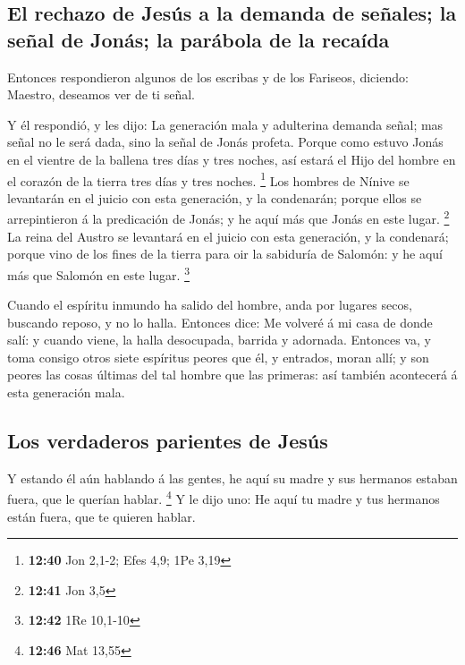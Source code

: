 \hypertarget{el-rechazo-de-jesuxfas-a-la-demanda-de-seuxf1ales-la-seuxf1al-de-jonuxe1s-la-paruxe1bola-de-la-recauxedda}{%
\subsection{El rechazo de Jesús a la demanda de señales; la señal de
Jonás; la parábola de la
recaída}\label{el-rechazo-de-jesuxfas-a-la-demanda-de-seuxf1ales-la-seuxf1al-de-jonuxe1s-la-paruxe1bola-de-la-recauxedda}}

 Entonces respondieron algunos de los escribas y de los
Fariseos, diciendo: Maestro, deseamos ver de ti señal.

 Y él respondió, y les dijo: La generación mala y
adulterina demanda señal; mas señal no le será dada, sino la señal de
Jonás profeta.  Porque como estuvo Jonás en el vientre de
la ballena tres días y tres noches, así estará el Hijo del hombre en el
corazón de la tierra tres días y tres noches. \footnote{\textbf{12:40}
  Jon 2,1-2; Efes 4,9; 1Pe 3,19}  Los hombres de Nínive
se levantarán en el juicio con esta generación, y la condenarán; porque
ellos se arrepintieron á la predicación de Jonás; y he aquí más que
Jonás en este lugar. \footnote{\textbf{12:41} Jon 3,5} 
La reina del Austro se levantará en el juicio con esta generación, y la
condenará; porque vino de los fines de la tierra para oir la sabiduría
de Salomón: y he aquí más que Salomón en este lugar. \footnote{\textbf{12:42}
  1Re 10,1-10}

 Cuando el espíritu inmundo ha salido del hombre, anda
por lugares secos, buscando reposo, y no lo halla. 
Entonces dice: Me volveré á mi casa de donde salí: y cuando viene, la
halla desocupada, barrida y adornada.  Entonces va, y
toma consigo otros siete espíritus peores que él, y entrados, moran
allí; y son peores las cosas últimas del tal hombre que las primeras:
así también acontecerá á esta generación mala.

\hypertarget{los-verdaderos-parientes-de-jesuxfas}{%
\subsection{Los verdaderos parientes de
Jesús}\label{los-verdaderos-parientes-de-jesuxfas}}

 Y estando él aún hablando á las gentes, he aquí su madre
y sus hermanos estaban fuera, que le querían hablar. \footnote{\textbf{12:46}
  Mat 13,55}  Y le dijo uno: He aquí tu madre y tus
hermanos están fuera, que te quieren hablar.

